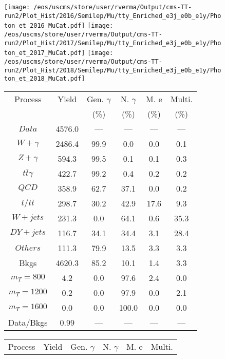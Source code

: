 \begin{figure}
\centering
\texttt{[image: /eos/uscms/store/user/rverma/Output/cms-TT-run2/Plot\_Hist/2016/Semilep/Mu/tty\_Enriched\_e3j\_e0b\_e1y/Photon\_et\_2016\_MuCat.pdf]}
\texttt{[image: /eos/uscms/store/user/rverma/Output/cms-TT-run2/Plot\_Hist/2017/Semilep/Mu/tty\_Enriched\_e3j\_e0b\_e1y/Photon\_et\_2017\_MuCat.pdf]}
\texttt{[image: /eos/uscms/store/user/rverma/Output/cms-TT-run2/Plot\_Hist/2018/Semilep/Mu/tty\_Enriched\_e3j\_e0b\_e1y/Photon\_et\_2018\_MuCat.pdf]}
\begin{minipage}[c]{0.32\textwidth}
\centering
\tiny{
\begin{tabular}{cccccc}
\hline
Process & Yield & Gen. $\gamma$ & N. $\gamma$ & M. e & Multi. \\
 &  & (\%) & (\%) & (\%) & (\%)  \\
\hline
                                                                      $ Data $ &  4576.0 &  --- &  --- &  --- &  ---\\
$ W+\gamma $ &  2486.4 &  99.9 &  0.0 &  0.0 &  0.1\\
$ Z+\gamma $ &  594.3 &  99.5 &  0.1 &  0.1 &  0.3\\
$ t\bar{t}\gamma $ &  422.7 &  99.2 &  0.4 &  0.2 &  0.2\\
$ QCD $ &  358.9 &  62.7 &  37.1 &  0.0 &  0.2\\
$ t/t\bar{t} $ &  298.7 &  30.2 &  42.9 &  17.6 &  9.3\\
$ W+jets $ &  231.3 &  0.0 &  64.1 &  0.6 &  35.3\\
$ DY+jets $ &  116.7 &  34.1 &  34.4 &  3.1 &  28.4\\
$ Others $ &  111.3 &  79.9 &  13.5 &  3.3 &  3.3\\
Bkgs &  4620.3 &  85.2 &  10.1 &  1.4 &  3.3\\
$ m_{T} = 800 $ &  4.2 &  0.0 &  97.6 &  2.4 &  0.0\\
$ m_{T} = 1200 $ &  0.2 &  0.0 &  97.9 &  0.0 &  2.1\\
$ m_{T} = 1600 $ &  0.0 &  0.0 &  100.0 &  0.0 &  0.0\\
Data/Bkgs &  0.99 &  --- &  --- &  --- &  ---\\
\hline
\end{tabular}
}
\end{minipage}
\begin{minipage}[c]{0.32\textwidth}
\centering
\tiny{
\begin{tabular}{cccccc}
\hline
Process & Yield & Gen. $\gamma$ & N. $\gamma$ & M. e & Multi. \\

\end{tabular}}
\end{minipage}
\end{figure}
